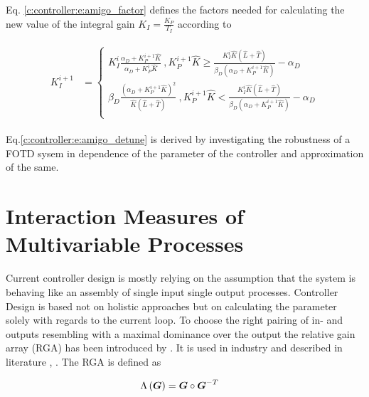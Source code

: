 Eq. \ref{c:controller:e:amigo_factor} defines the factors needed for calculating the new value of the integral gain $K_I = \frac{K_P}{T_I}$ according to

\begin{align}
\begin{split}
K_I^{i+1} &= \begin{cases}
	K_I^i \frac{\alpha_D + K_P^{i+1} \hat{K}}{\alpha_D + K_P^{i} \hat{K}} ~, K_P^{i+1} \hat{K} \geq \frac{K_I^{i}\hat{K}\left(\hat{L}+\hat{T}\right)}{\beta_D \left( \alpha_D + K_P^{i+1} \hat{K}\right)} - \alpha_D\\
	\beta_D \frac{\left( \alpha_D + K_P^{i+1} \hat{K} \right)^2}{\hat{K} \left( \hat{L}+ \hat{T} \right)}~, K_P^{i+1} \hat{K} < \frac{K_I^{i}\hat{K}\left(\hat{L}+\hat{T}\right)}{\beta_D \left( \alpha_D + K_P^{i+1} \hat{K}\right)} - \alpha_D\\
\end{cases}
\end{split}
\label{c:controller:e:amigo_detune}
\end{align} 

Eq.\ref{c:controller:e:amigo_detune} is derived by investigating the robustness of a FOTD sysem in dependence of the parameter of the controller and approximation of the same.\\

\section{Interaction Measures of Multivariable Processes} %
\label{c:controller:s:rga}

Current controller design is mostly relying on the assumption that the system is behaving like an assembly of single input single output processes. Controller Design is based not on holistic approaches but on calculating the parameter solely with regards to the current loop. To choose the right pairing of in- and outputs resembling with a maximal dominance over the output the relative gain array (RGA) has been introduced by \cite{Bristol1966}. It is used in industry and described in literature \cite[p. 88 ff.]{Skogestad2005}, \cite[p.219 ff.]{Glad2000}. The RGA is defined as

\begin{align}
\begin{split}
\Lambda\left(\mbox{\boldmath$G$}\right) &= \mbox{\boldmath$G$} \circ \mbox{\boldmath$G$}^{-T}
\end{split}
\label{c:controller:e:rga}
\end{align}

